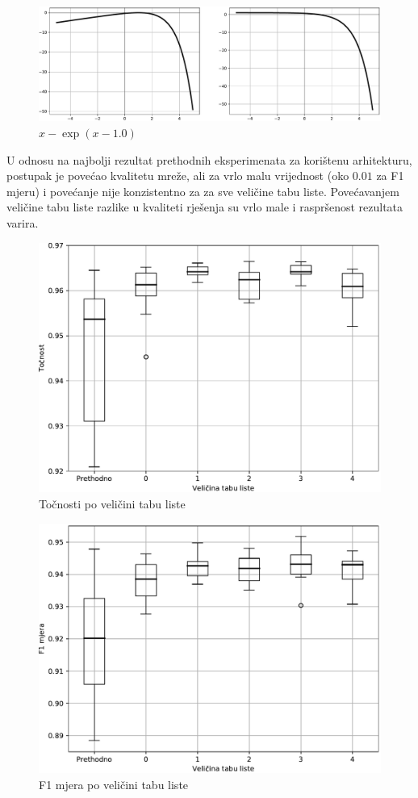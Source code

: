 \documentclass[times, utf8, numeric, diplomski]{fer}
\begin{document}
\begin{figure}[H]
\includegraphics[width=\textwidth]{dpav4_gp_f5.pdf}
\centering
\caption{$x - \exp(x - 1.0)$}
\label{fig:dpav4_gp_f5}
\end{figure}

U odnosu na najbolji rezultat prethodnih eksperimenata za korištenu arhitekturu, postupak je povećao kvalitetu mreže, ali za vrlo malu vrijednost (oko $0.01$ za F1 mjeru) i povećanje nije konzistentno za za sve veličine tabu liste. Povećavanjem veličine tabu liste razlike u kvaliteti rješenja su vrlo male i raspršenost rezultata varira.

\begin{figure}[H]
\includegraphics[width=.9\textwidth]{GP_9class_acc_plus.pdf}
\centering
\caption{Točnosti po veličini tabu liste}
\label{fig:gp_9_acc}
\end{figure}

\begin{figure}[H]
\includegraphics[width=.9\textwidth]{GP_9class_f1_plus.pdf}
\centering
\caption{F1 mjera po veličini tabu liste}
\label{fig:gp_9_f1}
\end{figure}
\end{document}
